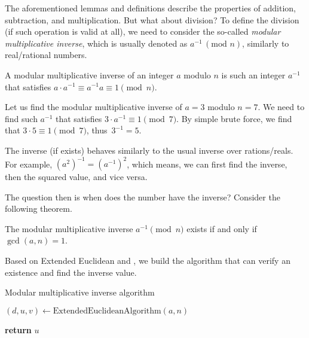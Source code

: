 \documentclass[../lecture-notes-148x210.tex]{subfiles}
\begin{document}
The aforementioned lemmas and definitions describe the properties of addition, subtraction, and multiplication. But what about division? To define the division (if such operation is valid at all), we need to consider the so-called \emph{modular multiplicative inverse}, which is usually denoted as $a^{-1} \, (\text{mod } n)$, similarly to real/rational numbers.

\begin{definition}
    A modular multiplicative inverse of an integer $a$ modulo $n$ is such an integer $a^{-1}$ that satisfies $a \cdot a^{-1} \equiv a^{-1}a \equiv 1 \pmod{n}$.
\end{definition}

\begin{example}
    Let us find the modular multiplicative inverse of $a = 3$ modulo $n = 7$.
    We need to find such $a^{-1}$ that satisfies $3 \cdot a^{-1} \equiv 1 \pmod{7}$.
    By simple brute force, we find that $3 \cdot 5 \equiv 1 \pmod{7}$, thus~$3^{-1} = 5$.
\end{example}

\begin{remark}
    The inverse (if exists) behaves similarly to the usual inverse over rations/reals. For example, $(a^{2})^{-1} = (a^{-1})^{2}$, which means, we can first find the inverse, then the squared value, and vice versa.
\end{remark}

The question then is when does the number have the inverse? Consider the following theorem.

\vspace{-1.5mm}

\begin{theorem}\label{th:inverse_existence}
    The modular multiplicative inverse $a^{-1} \pmod{n}$ exists if and only if $\gcd(a, n) = 1$.
\end{theorem}

Based on Extended Euclidean  and , we build the algorithm that can verify an existence and find the inverse value.

\begin{algorithm}[H]
    \caption{Modular multiplicative inverse algorithm} \label{alg:modular_inverse}
        
    $(d, u, v) \gets \text{ExtendedEuclideanAlgorithm}(a, n)$ 


    \textbf{return} $u$
\end{algorithm}
\end{document}
